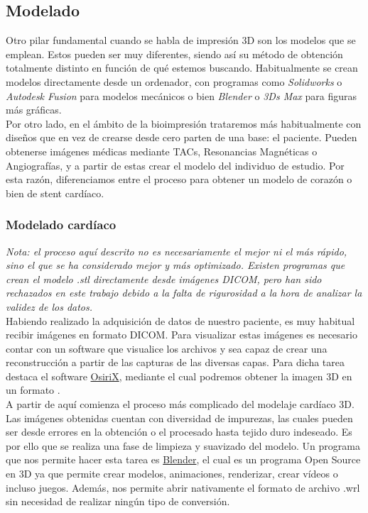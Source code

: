 \documentclass[a4paper,12pt]{article}
\begin{document}
\FloatBarrier
\subsection{Modelado}
Otro pilar fundamental cuando se habla de impresión 3D son los modelos que se emplean. Estos pueden ser muy diferentes, siendo así su método de obtención totalmente distinto en función de qué estemos buscando. Habitualmente se crean modelos directamente desde un ordenador, con programas como \emph{Solidworks} o \emph{Autodesk Fusion} para modelos mecánicos o bien \emph{Blender} o \emph{3Ds Max} para figuras más gráficas.\\

Por otro lado, en el ámbito de la bioimpresión trataremos más habitualmente con diseños que en vez de crearse desde cero parten de una base: el paciente. Pueden obtenerse imágenes médicas mediante TACs, Resonancias Magnéticas o Angiografías, y a partir de estas crear el modelo del individuo de estudio. Por esta razón, diferenciamos entre el proceso para obtener un modelo de corazón o bien de stent cardíaco.\\

\subsubsection{Modelado cardíaco}
\emph{Nota: el proceso aquí descrito no es necesariamente el mejor ni el más rápido, sino el que se ha considerado mejor y más optimizado. Existen programas que crean el modelo .stl directamente desde imágenes DICOM, pero han sido rechazados en este trabajo debido a la falta de rigurosidad a la hora de analizar la validez de los datos.}\\

Habiendo realizado la adquisición de datos de nuestro paciente, es muy habitual recibir imágenes en formato DICOM. Para visualizar estas imágenes es necesario contar con un software que visualice los archivos y sea capaz de crear una reconstrucción a partir de las capturas de las diversas capas. Para dicha tarea destaca el software \href{http://www.osirix-viewer.com/}{OsiriX}, mediante el cual podremos obtener la imagen 3D en un formato .\\

A partir de aquí comienza el proceso más complicado del modelaje cardíaco 3D. Las imágenes obtenidas cuentan con diversidad de impurezas, las cuales pueden ser desde errores en la obtención o el procesado hasta tejido duro indeseado. Es por ello que se realiza una fase de limpieza y suavizado del modelo. Un programa que nos permite hacer esta tarea es \href{https://www.blender.org/}{Blender}, el cual es un programa Open Source en 3D ya que permite crear modelos, animaciones, renderizar, crear vídeos o incluso juegos. Además, nos permite abrir nativamente el formato de archivo .wrl sin necesidad de realizar ningún tipo de conversión.\\
\end{document}
